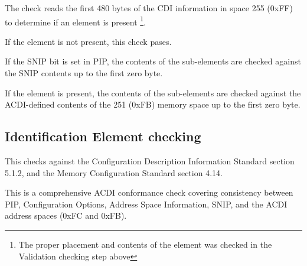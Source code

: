The check reads the first 480 bytes of the CDI information in space 255 (0xFF) to 
determine if an  element is present
\footnote{The proper placement and contents of the  element
was checked in the Validation checking step above}.  

If the  element is not present, this check pases.

If the SNIP bit is set in PIP, the contents of the 
sub-elements are checked against the SNIP contents
up to the first zero byte.

If the  element is present, the contents of the 
 sub-elements are checked against the ACDI-defined
contents of the 251 (0xFB) memory space up to the first zero byte.

\subsection{Identification Element checking}

This checks against the Configuration Description Information Standard section 5.1.2,
and the Memory Configuration Standard section 4.14.

This is a comprehensive ACDI conformance check covering consistency between PIP, Configuration
Options, Address Space Information, SNIP, and the ACDI address spaces (0xFC and 0xFB).

